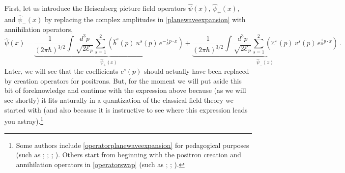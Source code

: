 \documentclass[12pt,secnumarabic,amsmath,amssymb,balancelastpage,nofootinbib]{article}
\begin{document}
First, let us introduce the Heisenberg picture field operators $\widehat{\psi} (x)$, $\widehat{\psi}_+(x)$, and $\widehat{\psi}_-(x)$ by replacing the complex amplitudes in \eqref{planewaveexpansion} with annihilation operators,
\begin{equation}
\widehat{\psi} (x) = \underbrace{\frac{1}{(2\pi\hbar)^{3/2}}\int{ \frac{d^3 p}{\sqrt{2 \mathcal{E}_p}} \sum_{s=1}^2 \left(\widehat{b}^s (p) \: u^s (p) \, e^{-\frac{i}{\hbar} p \cdot x}\right)}}_{\mbox{$\widehat{\psi}_+(x)$}}
+\underbrace{\frac{1}{(2\pi\hbar)^{3/2}}\int{ \frac{d^3 p}{\sqrt{2 \mathcal{E}_p}} \sum_{s=1}^2 \left(\widehat{c}^{\,s} (p) \: v^s (p) \,  e^{\frac{i}{\hbar} p \cdot x}\right)}}_{\mbox{$\widehat{\psi}_-(x)$}}
\ .
\label{operatorplanewaveexpansion}
\end{equation}
Later, we will see that the coefficients $c^s (p)$ should actually have been replaced by creation operators for positrons.  But, for the moment we will put aside this bit of foreknowledge and continue with the expression above because (as we will see shortly) it fits naturally in a quantization of the classical field theory we started with (and also because it is instructive to see where this expression leads you astray).\footnote{Some authors include \eqref{operatorplanewaveexpansion} for pedagogical purposes (such as \citealp[sec.\ 8a]{schweberQFT}; \citealp[sec.\ 3.5]{peskinschroeder}; \citealp[sec.\ 5.3]{greiner1996}; \citealp[ch.\ 5]{tong}).  Others start from beginning with the positron creation and annihilation operators in \eqref{operatorswap} (such as \citealp[pg.\ 70]{hatfield}; \citealp[pg.\ 138]{ryder}; \citealp[pg.\ 211]{schwartz}).}
\end{document}
